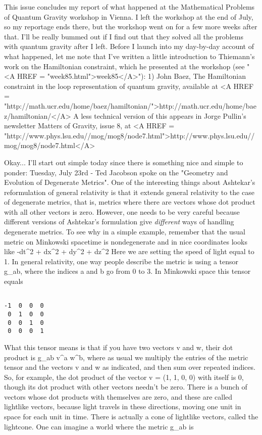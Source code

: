 

This issue concludes my report of what happened at the
Mathematical Problems of Quantum Gravity workshop in Vienna.  I
left the workshop at the end of July, so my reportage ends there,
but the workshop went on for a few more weeks after that.  I'll
be really bummed out if I find out that they solved all the
problems with quantum gravity after I left.
Before I launch into my day-by-day account of what happened,
let me note that I've written a little introduction to Thiemann's
work on the Hamiltonian constraint, which he presented at the
workshop (see "<A HREF = "week85.html">week85</A>"):
1) John Baez, The Hamiltonian constraint in the loop
representation of quantum gravity, available 
at <A HREF =
"http://math.ucr.edu/home/baez/hamiltonian/">http://math.ucr.edu/home/baez/hamiltonian/</A>
 A less technical version of this appears in Jorge Pullin's 
newsletter Matters of Gravity, issue 8, at
<A HREF = "http://www.phys.lsu.edu//mog/mog8/node7.html">http://www.phys.lsu.edu//mog/mog8/node7.html</A>

Okay... I'll start out simple today since there is something nice
and simple to ponder:
Tuesday, July 23rd - Ted Jacobson spoke on the "Geometry and
Evolution of Degenerate Metrics".  One of the interesting things
about Ashtekar's reformulation of general relativity is that it
extends general relativity to the case of degenerate metrics,
that is, metrics where there are vectors whose dot product
with all other vectors is zero.   However, one needs to be very
careful because different versions of Ashtekar's formulation give
\emph{different} ways of handling degenerate metrics.
To see why in a simple example, remember that the usual metric on
Minkowski spacetime is nondegenerate and in nice coordinates
looks like
-dt^2 + dx^2 + dy^2 + dz^2
Here we are setting the speed of light equal to 1.  In general
relativity, one way people describe the metric is using a tensor
g_{ab}, where the indices a and b go from 0 to 3.  In
Minkowski space this tensor equals

\begin{verbatim}

-1  0  0  0 
 0  1  0  0
 0  0  1  0
 0  0  0  1
\end{verbatim}
    
What this tensor means is that if you have two vectors v and w,
their dot product is g_{ab} v^a w^b, where as usual we multiply
the entries of the metric tensor and the vectors v and w as
indicated, and then sum over repeated indices.  So, for example,
the dot product of the vector 
v = (1, 1, 0, 0)
with itself is 0, though its dot product with other vectors
needn't be zero.   There is a bunch of vectors whose dot products
with themselves are zero, and these are called lightlike vectors,
because light travels in these directions, moving one unit in
space for each unit in time.   There is actually a cone of
lightlike vectors, called the lightcone.
One can imagine a world where the metric g_{ab} is

